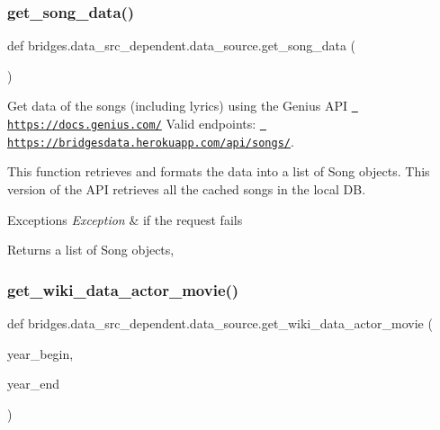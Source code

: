 \subsubsection{\texorpdfstring{get\_song\_data()}{get\_song\_data()}}
{\footnotesize\ttfamily def bridges.\+data\+\_\+src\+\_\+dependent.\+data\+\_\+source.\+get\+\_\+song\+\_\+data (\begin{DoxyParamCaption}{ }\end{DoxyParamCaption})}



Get data of the songs (including lyrics) using the Genius A\+PI \href{https://docs.genius.com/}{\texttt{ https\+://docs.\+genius.\+com/}} Valid endpoints\+: \href{https://bridgesdata.herokuapp.com/api/songs/}{\texttt{ https\+://bridgesdata.\+herokuapp.\+com/api/songs/}}. 

This function retrieves and formats the data into a list of Song objects. This version of the A\+PI retrieves all the cached songs in the local DB.


\begin{DoxyExceptions}{Exceptions}
{\em Exception} & if the request fails\\
\hline
\end{DoxyExceptions}
\begin{DoxyReturn}{Returns}
a list of Song objects, 
\end{DoxyReturn}
\mbox{\label{namespacebridges_1_1data__src__dependent_1_1data__source_a15db0d52db8b6e096db60f99b2f0171d}} 
\subsubsection{\texorpdfstring{get\_wiki\_data\_actor\_movie()}{get\_wiki\_data\_actor\_movie()}}
{\footnotesize\ttfamily def bridges.\+data\+\_\+src\+\_\+dependent.\+data\+\_\+source.\+get\+\_\+wiki\+\_\+data\+\_\+actor\+\_\+movie (\begin{DoxyParamCaption}\item[{}]{year\+\_\+begin,  }\item[{}]{year\+\_\+end }\end{DoxyParamCaption})}


